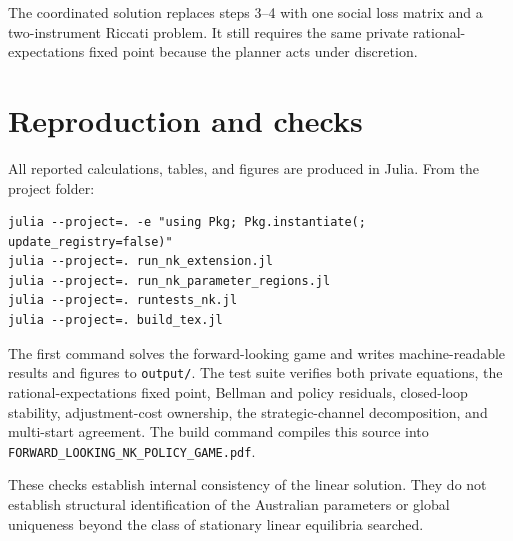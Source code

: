 \documentclass[11pt]{article}
\begin{document}
The coordinated solution replaces steps 3--4 with one social loss matrix and a
two-instrument Riccati problem. It still requires the same private rational-
expectations fixed point because the planner acts under discretion.

\section{Reproduction and checks}

All reported calculations, tables, and figures are produced in Julia. From the
project folder:
\begin{verbatim}
julia --project=. -e "using Pkg; Pkg.instantiate(; update_registry=false)"
julia --project=. run_nk_extension.jl
julia --project=. run_nk_parameter_regions.jl
julia --project=. runtests_nk.jl
julia --project=. build_tex.jl
\end{verbatim}
The first command solves the forward-looking game and writes machine-readable
results and figures to \texttt{output/}. The test suite verifies both private
equations, the rational-expectations fixed point, Bellman and policy residuals,
closed-loop stability, adjustment-cost ownership, the strategic-channel
decomposition, and multi-start agreement. The build command compiles this
source into \texttt{FORWARD\_LOOKING\_NK\_POLICY\_GAME.pdf}.

These checks establish internal consistency of the linear solution. They do
not establish structural identification of the Australian parameters or
global uniqueness beyond the class of stationary linear equilibria searched.
\end{document}
